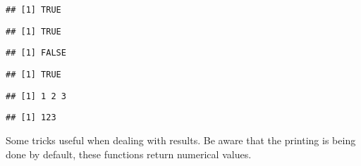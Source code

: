 \documentclass[paper=a4,10pt,div=17,headsepline,BCOR=12mm,twoside,open=right]{scrbook}\usepackage{knitr}
\begin{document}
\begin{knitrout}
\begin{kframe}
\begin{alltt}
\hlstd{(}\hlstd{)}
\end{alltt}
\begin{verbatim}
## [1] TRUE
\end{verbatim}
\begin{alltt}
\hlstd{(}\hlstd{)}
\end{alltt}
\begin{verbatim}
## [1] TRUE
\end{verbatim}
\begin{alltt}
\hlstd{(}\hlstd{)}
\end{alltt}
\begin{verbatim}
## [1] FALSE
\end{verbatim}
\begin{alltt}
\hlstd{(}\hlopt{-}\hlstd{)}
\end{alltt}
\begin{verbatim}
## [1] TRUE
\end{verbatim}
\end{kframe}
\end{knitrout}

\begin{knitrout}\footnotesize
{}\color{fgcolor}\begin{kframe}
\begin{alltt}
 \hlkwb{<-} \hlstd{(}\hlstd{,} \hlstd{,} \hlstd{)}
 \hlkwb{<-} 
\end{alltt}
\begin{verbatim}
## [1] 1 2 3
\end{verbatim}
\begin{alltt}
\end{alltt}
\begin{verbatim}
## [1] 123
\end{verbatim}
\end{kframe}
\end{knitrout}

Some tricks useful when dealing with results. Be aware that the printing is being done by default, these functions return numerical values.
\end{document}

